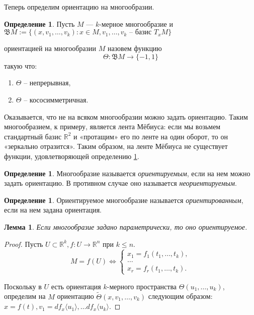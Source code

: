 \documentclass[a5paper]{article}
\newcounter{through}
\theoremstyle{plain}
\newtheorem{lemma}[through]{Лемма}
\theoremstyle{definition}
\newtheorem{definition}[through]{Определение}
\numberwithin{through}{section}
\numberwithin{equation}{section}
\begin{document}
Теперь определим ориентацию на многообразии.
\begin{definition} \label{orient}
	Пусть $M$ --- $k$-мерное многообразие и
	$\mathfrak{B}M := \{ (x,v_1,\ldots,v_k): x \in M, v_1,\ldots,v_k \text{ -- базис } 
	T_x M\}$
\end{definition}
ориентацией на многообразии $M$ назовем функцию 
\[\Theta: \mathfrak{B}M \to \{-1,1\} \]
такую что:
\begin{enumerate}
	\item
	$\Theta$ -- непрерывная,
	
	\item
	$\Theta$ -- кососимметричная.
\end{enumerate}

Оказывается, что не на всяком многообразии можно задать ориентацию. 
Таким многообразием, к примеру, является лента Мёбиуса: 
если мы возьмем стандартный базис $\mathbb{R}^2$ и «протащим» 
его по ленте на один оборот, то он «зеркально отразится». 
Таким образом, на ленте Мёбиуса не существует функции, удовлетворяющей определению
\ref{orient}.

\begin{definition}
	Многообразие называется \textit{ориентируемым}, если на нем можно задать ориентацию.
	В противном случае оно называется \textit{неориентируемым}.
\end{definition}

\begin{definition}
	Ориентируемое многообразие называется \textit{ориентированным},
	если на нем задана ориентация.
\end{definition}

\begin{lemma}
	Если многообразие задано параметрически, то оно ориентируемое.
\end{lemma}

\begin{proof}
	Пусть $U \subset \mathbb{R}^k, f: U \to \mathbb{R}^n$ при $k \leq n$.
	\begin{equation*}
		M = f(U) \iff
		\begin{cases}
		x_1 = f_1(t_1,\ldots,t_k), \\
		\ldots \\
		x_r = f_r(t_1,\ldots, t_k).
		\end{cases}
	\end{equation*}
	
	Поскольку в $U$ есть ориентация $k$-мерного пространства $\Theta (u_1,\ldots,u_k)$,
	определим на $M$ ориентацию $\tilde{\Theta}(x,v_1,\ldots,v_k)$ следующим образом:
	$x = f(t), v_1 =df_x \langle u_1 \rangle, \ldots df_x \langle u_k \rangle$.
\end{proof}
\end{document}
